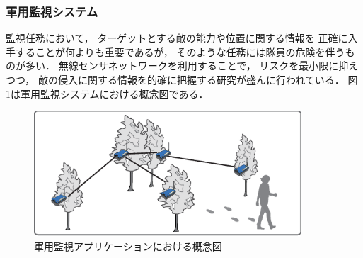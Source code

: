


\subsubsection{軍用監視システム}

\vspace{0.5em}監視任務において，
ターゲットとする敵の能力や位置に関する情報を
正確に入手することが何よりも重要であるが，
そのような任務には隊員の危険を伴うものが多い．
無線センサネットワークを利用することで，
リスクを最小限に抑えつつ，
敵の侵入に関する情報を的確に把握する研究が盛んに行われている．
図\ref{fig:surveillance_system}は軍用監視システムにおける概念図である．

\begin{figure}[htbp]
 \begin{center}
  \includegraphics[width=100mm]{./images/surveillance_system.eps}
 \end{center}
 \caption{軍用監視アプリケーションにおける概念図}
 \label{fig:surveillance_system}
\end{figure}


